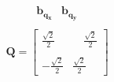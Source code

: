 \documentclass[preview]{standalone}
\begin{document}
\begin{align*}
\begin{array}{c}\begin{matrix}\hspace{1cm} \mathbf{b_{q_x}} & \mathbf{b_{q_y}}  \end{matrix} \\  \mathbf{Q} = \begin{bmatrix} \frac{\sqrt{2}}{2} & \quad \frac{\sqrt{2}}{2} \\ \\-\frac{\sqrt{2}}{2} & \frac{\sqrt{2}}{2} \end{bmatrix} \end{array}
\end{align*}
\end{document}
